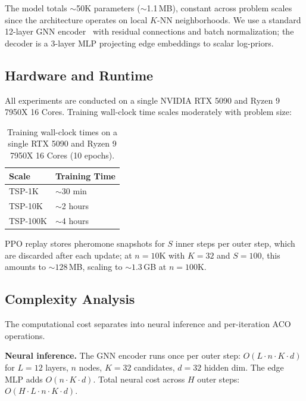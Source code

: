 \documentclass[sigconf,review]{acmart}
\begin{document}
The model totals ${\sim}$50K parameters (${\sim}$1.1\,MB), constant across problem scales since the architecture operates on local $K$-NN neighborhoods.
We use a standard 12-layer GNN encoder~\cite{deepaco} with residual connections and batch normalization; the decoder is a 3-layer MLP projecting edge embeddings to scalar log-priors.

\subsection{Hardware and Runtime}
\label{app:hardware}

All experiments are conducted on a single NVIDIA RTX 5090 and Ryzen 9 7950X 16 Cores.
Training wall-clock time scales moderately with problem size:

\begin{table}[h]
\centering
\caption{Training wall-clock times on a single RTX 5090 and Ryzen 9 7950X 16 Cores (10 epochs).}
\label{tab:training-times}
\small
\begin{tabularx}{\columnwidth}{lY}
\toprule
Scale & Training Time \\
\midrule
TSP-1K   & $\sim$30 min \\
TSP-10K  & $\sim$2 hours \\
TSP-100K & $\sim$4 hours \\
\bottomrule
\end{tabularx}
\end{table}

PPO replay stores pheromone snapshots for $S$ inner steps per outer step, which are discarded after each update; at $n{=}10$K with $K{=}32$ and $S{=}100$, this amounts to ${\sim}128$\,MB, scaling to ${\sim}1.3$\,GB at $n{=}100$K.

\subsection{Complexity Analysis}
\label{app:complexity}

The computational cost separates into neural inference and per-iteration ACO operations.

\textbf{Neural inference.}
The GNN encoder runs once per outer step: $O(L \cdot n \cdot K \cdot d)$ for $L{=}12$ layers, $n$ nodes, $K{=}32$ candidates, $d{=}32$ hidden dim.
The edge MLP adds $O(n \cdot K \cdot d)$.
Total neural cost across $H$ outer steps: $O(H \cdot L \cdot n \cdot K \cdot d)$.
\end{document}
